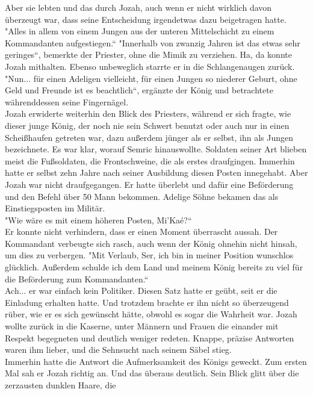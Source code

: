 Aber sie lebten und das durch Jozah, auch wenn er nicht wirklich davon überzeugt war, dass seine 
Entscheidung irgendetwas dazu beigetragen hatte.\\
"Alles in allem von einem Jungen aus der unteren Mittelschicht zu einem Kommandanten aufgestiegen.``
"Innerhalb von zwanzig Jahren ist das etwas sehr geringes``, bemerkte der Priester, ohne die Mimik 
zu verziehen. Ha, da konnte Jozah mithalten. Ebenso unbeweglich starrte er in die Schlangenaugen 
zurück.\\ 
"Nun... für einen Adeligen vielleicht, für einen Jungen so niederer Geburt, ohne Geld und Freunde 
ist es beachtlich``, ergänzte der König und betrachtete währenddessen seine Fingernägel.\\
Jozah erwiderte weiterhin den Blick des Priesters, während er sich fragte, wie dieser junge König, 
der noch nie sein Schwert benutzt oder auch nur in einen Scheißhaufen getreten war, dazu außerdem 
jünger als er selbst, ihn als Jungen bezeichnete. Es war klar, worauf Semric hinauswollte. Soldaten 
seiner Art blieben meist die Fußsoldaten, die Frontschweine, die als erstes draufgingen. Immerhin 
hatte er selbst zehn Jahre nach seiner Ausbildung diesen Posten innegehabt. Aber Jozah war nicht 
draufgegangen. Er hatte überlebt und dafür eine Beförderung und den Befehl über 50 Mann bekommen. 
Adelige Söhne bekamen das als Einstiegsposten im Militär.\\
"Wie wäre es mit einem höheren Posten, Mi'Kaé?``\\
Er konnte nicht verhindern, dass er einen Moment überrascht aussah. Der Kommandant verbeugte sich 
rasch, auch wenn der König ohnehin nicht hinsah, um dies zu verbergen. "Mit Verlaub, Ser, ich bin 
in meiner Position wunschlos glücklich. Außerdem schulde ich dem Land und meinem König bereits zu 
viel für die Beförderung zum Kommandanten.``\\
Ach... er war einfach kein Politiker. Diesen Satz hatte er geübt, seit er die Einladung erhalten 
hatte. Und trotzdem brachte er ihn nicht so überzeugend rüber, wie er es sich gewünscht hätte, 
obwohl es sogar die Wahrheit war. Jozah wollte zurück in die Kaserne, unter Männern und Frauen die 
einander mit Respekt begegneten und deutlich weniger redeten. Knappe, präzise Antworten waren ihm 
lieber, und die Sehnsucht nach seinem Säbel stieg.\\
Immerhin hatte die Antwort die Aufmerksamkeit des Königs geweckt. Zum ersten Mal sah er Jozah 
richtig an. Und das überaus deutlich. Sein Blick glitt über die zerzausten dunklen Haare, die 

